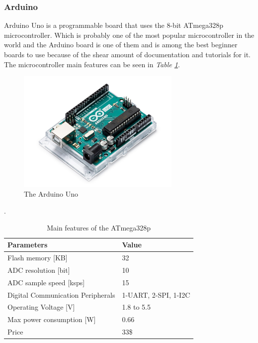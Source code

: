 \subsubsection{Arduino}

Arduino Uno is a programmable board that uses the 8-bit ATmega328p microcontroller.
Which is probably one of the most popular microcontroller in the world and the Arduino board is one of them and is among the best beginner boards to use because of the shear amount of documentation and tutorials for it.
The microcontroller main features can be seen in \textit{Table \ref{Tab:ATmega328p}}.


\begin{figure}[h]
    \centering
    \includegraphics[width=0.70\textwidth]{graphics/ArduinoUNo.jpg}
    \caption{The Arduino Uno \cite{noauthor_arduino_nodate}}
    \label{fig:Arduino}
\end{figure}

\begin{table}[h]\caption{Main features of the ATmega328p \cite{noauthor_atmega328p_nodate}}.\label{Tab:ATmega328p}
\centering
    \begin{tabular}{|l|l|}
    \hline
        Parameters                        & Value                \\ \hline
        Flash memory [KB]                 & 32                      \\ \hline
        ADC resolution [bit]              & 10                   \\ \hline
        ADC sample speed [ksps]           & 15                     \\ \hline
        Digital Communication Peripherals & 1-UART, 2-SPI, 1-I2C \\ \hline
        Operating Voltage [V]             & 1.8 to 5.5           \\ \hline
        Max power consumption [W]         & 0.66               \\ \hline
        Price                             & 33\$                \\ \hline
    \end{tabular}
\end{table}


